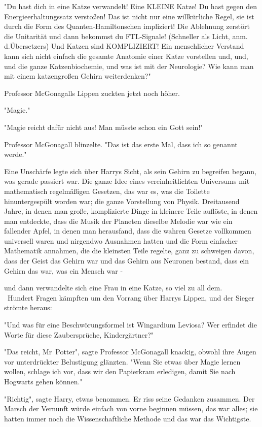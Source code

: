 {"Du hast dich in eine Katze verwandelt! Eine KLEINE Katze! Du hast gegen den Energieerhaltungssatz verstoßen! Das ist nicht nur eine willkürliche Regel, sie ist durch die Form des Quanten-Hamiltonschen impliziert! Die Ablehnung zerstört die Unitarität und dann bekommst du FTL-Signale! (Schneller als Licht, anm. d.Übersetzers) Und Katzen sind KOMPLIZIERT! Ein menschlicher Verstand kann sich nicht einfach die gesamte Anatomie einer Katze vorstellen und, und, und die ganze Katzenbiochemie, und was ist mit der Neurologie? Wie kann man mit einem katzengroßen Gehirn weiterdenken?" ~ ~

Professor McGonagalls Lippen zuckten jetzt noch höher.

"Magie." ~ ~

"Magie reicht dafür nicht aus! Man müsste schon ein Gott sein!" ~ ~

Professor McGonagall blinzelte. "Das ist das erste Mal, dass ich so genannt werde."

Eine Unschärfe legte sich über Harrys Sicht, als sein Gehirn zu begreifen begann, was gerade passiert war. Die ganze Idee eines vereinheitlichten Universums mit mathematisch regelmäßigen Gesetzen, das war es, was die Toilette hinuntergespült worden war; die ganze Vorstellung von Physik. Dreitausend Jahre, in denen man große, komplizierte Dinge in kleinere Teile auflöste, in denen man entdeckte, dass die Musik der Planeten dieselbe Melodie war wie ein fallender Apfel, in denen man herausfand, dass die wahren Gesetze vollkommen universell waren und nirgendwo Ausnahmen hatten und die Form einfacher Mathematik annahmen, die die kleinsten Teile regelte, ganz zu schweigen davon, dass der Geist das Gehirn war und das Gehirn aus Neuronen bestand, dass ein Gehirn das war, was ein Mensch war -

und dann verwandelte sich eine Frau in eine Katze, so viel zu all dem. ~ ~Hundert Fragen kämpften um den Vorrang über Harrys Lippen, und der Sieger strömte heraus:

"Und was für eine Beschwörungsformel ist Wingardium Leviosa? Wer erfindet die Worte für diese Zaubersprüche, Kindergärtner?" ~ ~

"Das reicht, Mr~Potter", sagte Professor McGonagall knackig, obwohl ihre Augen vor unterdrückter Belustigung glänzten. "Wenn Sie etwas über Magie lernen wollen, schlage ich vor, dass wir den Papierkram erledigen, damit Sie nach Hogwarts gehen können." ~ ~

"Richtig", sagte Harry, etwas benommen. Er riss seine Gedanken zusammen. Der Marsch der Vernunft würde einfach von vorne beginnen müssen, das war alles; sie hatten immer noch die Wissenschaftliche Methode und das war das Wichtigste.

}
